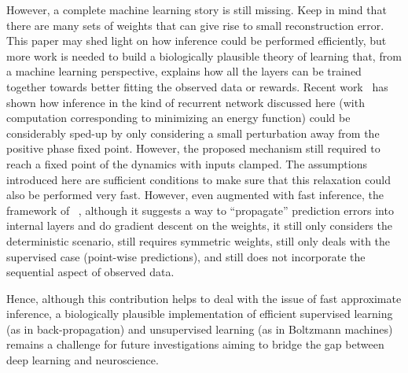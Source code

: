 \documentclass{article}
\newif\iffinal
\begin{document}
However, a complete machine learning story is still missing. Keep in mind that there are many
sets of weights that can give rise to small reconstruction error.  This paper may shed light
on how inference could be performed efficiently, but more work is needed to build a biologically plausible
theory of learning that, from a machine learning perspective, explains how all the layers can be
trained together towards better fitting the observed data or rewards.
Recent work~\citep{Scellier+Bengio-arxiv2016} has shown how
inference in the kind of recurrent network discussed here (with computation
corresponding to minimizing an energy function) could be considerably
sped-up by only considering a small perturbation away from the positive
phase fixed point. However, the proposed mechanism still required to reach
a fixed point of the dynamics with inputs clamped. The assumptions introduced here
are sufficient conditions to make sure that this relaxation
could also be performed very fast. However, even augmented with fast inference, the
framework of ~\citet{Scellier+Bengio-arxiv2016}, although it suggests a way to ``propagate''
prediction errors into internal layers and do gradient descent on the weights, it
still only considers the deterministic scenario, still requires symmetric weights,
still only deals with the supervised case (point-wise predictions), and still does
not incorporate the sequential aspect of observed data.

Hence, although this contribution helps to deal with the issue of fast
approximate inference, a biologically plausible implementation of efficient supervised
learning (as in back-propagation) and unsupervised learning (as in Boltzmann machines) remains
a challenge for future investigations aiming to bridge the gap between deep learning
and neuroscience.

\iffinal
\section*{Acknowledgments}

The authors would like to thank Tong Che, Vincent Dumoulin, Kumar Krishna Agarwal
for feedback and discussions, as well as NSERC, CIFAR, Samsung and
Canada Research Chairs for funding.%
\fi



%


\end{document}
